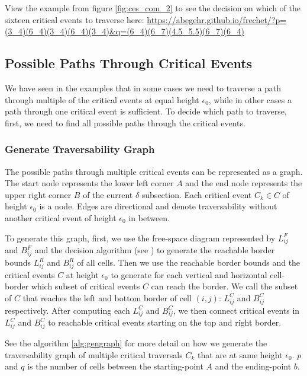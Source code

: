 View the example from figure \ref{fig:ces_com_2} to see the decision on which of the sixteen critical events to traverse here: \url{https://abegehr.github.io/frechet/?p=(3_4)(6_4)(3_4)(6_4)(3_4)&q=(6_4)(6_7)(4.5_5.5)(6_7)(6_4)}


\subsection{Possible Paths Through Critical Events} \label{sec:gengraph}

We have seen in the examples that in some cases we need to traverse a path through multiple of the critical events at equal height $\epsilon_0$, while in other cases a path through one critical event is sufficient. To decide which path to traverse, first, we need to find all possible paths through the critical events.

\subsubsection{Generate Traversability Graph}

The possible paths through multiple critical events can be represented as a graph. The start node represents the lower left corner $A$ and the end node represents the upper right corner $B$ of the current $\delta$ subsection. Each critical event $C_k \in C$ of height $\epsilon_0$ is a node. Edges are directional and denote traversability without another critical event of height $\epsilon_0$ in between.

To generate this graph, first, we use the free-space diagram represented by $L_{ij}^F$ and $B_{ij}^F$ and the decision algorithm (see \citet{altgodau}) to generate the reachable border bounds $L_{ij}^R$ and $B_{ij}^R$ of all cells. Then we use the reachable border bounds and the critical events $C$ at height $\epsilon_0$ to generate for each vertical and horizontal cell-border which subset of critical events $C$ can reach the border. We call the subset of $C$ that reaches the left and bottom border of cell $(i,j)$: $L_{ij}^C$ and $B_{ij}^C$ respectively. After computing each $L_{ij}^C$ and $B_{ij}^C$, we then connect critical events in $L_{ij}^C$ and $B_{ij}^C$ to reachable critical events starting on the top and right border.

See the algorithm \ref{alg:gengraph} for more detail on how we generate the traversability graph of multiple critical traversals $C_k$ that are at same height $\epsilon_0$. $p$ and $q$ is the number of cells between the starting-point $A$ and the ending-point $b$.


